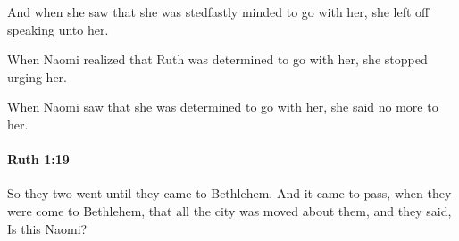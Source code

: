 			\begin{versebox}
					\item[BHS] 
					\item[LXX] 
					\item[ASV] And when she saw that she was stedfastly minded to go with her, she left off speaking unto her.
					\item[NIV] When Naomi realized that Ruth was determined to go with her, she stopped urging her.
					\item[NRSV] When Naomi saw that she was determined to go with her, she said no more to her.
			\end{versebox}

		\paragraph{Ruth 1:19} %
			\label{RUTH-1-19}

			So they two went until they came to Bethlehem. And it came to pass, when they were come to Bethlehem, that all the city was moved about them, and they said, Is this Naomi?


